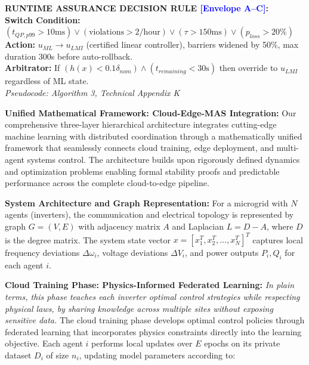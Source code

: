 \documentclass[12pt]{article}
\begin{document}
\begin{center}
\colorbox{red!20}{\begin{minipage}{0.95\textwidth}
\textbf{RUNTIME ASSURANCE DECISION RULE \textcolor{blue}{[Envelope A--C]}:} \\
\textbf{Switch Condition:} $(t_{QP,p99} > 10\text{ms}) \vee (\text{violations} > 2/\text{hour}) \vee (\tau > 150\text{ms}) \vee (p_{loss} > 20\%)$ \\
\textbf{Action:} $u_{ML} \rightarrow u_{LMI}$ (certified linear controller), barriers widened by 50\%, max duration 300s before auto-rollback. \\
\textbf{Arbitrator:} If $(h(x) < 0.1\delta_{nom}) \wedge (t_{remaining} < 30\text{s})$ then override to $u_{LMI}$ regardless of ML state. \\
\textit{Pseudocode: Algorithm 3, Technical Appendix K}
\end{minipage}}
\end{center}

\textbf{Unified Mathematical Framework: Cloud-Edge-MAS Integration:} Our comprehensive three-layer hierarchical architecture integrates cutting-edge machine learning with distributed coordination through a mathematically unified framework that seamlessly connects cloud training, edge deployment, and multi-agent systems control. The architecture builds upon rigorously defined dynamics and optimization problems enabling formal stability proofs and predictable performance across the complete cloud-to-edge pipeline.

\textbf{System Architecture and Graph Representation:} For a microgrid with $N$ agents (inverters), the communication and electrical topology is represented by graph $G = (V, E)$ with adjacency matrix $A$ and Laplacian $L = D - A$, where $D$ is the degree matrix. The system state vector $x = [x_1^T, x_2^T, \ldots, x_N^T]^T$ captures local frequency deviations $\Delta\omega_i$, voltage deviations $\Delta V_i$, and power outputs $P_i, Q_i$ for each agent $i$.

\textbf{Cloud Training Phase: Physics-Informed Federated Learning:} \textit{In plain terms, this phase teaches each inverter optimal control strategies while respecting physical laws, by sharing knowledge across multiple sites without exposing sensitive data.} The cloud training phase develops optimal control policies through federated learning that incorporates physics constraints directly into the learning objective. Each agent $i$ performs local updates over $E$ epochs on its private dataset $D_i$ of size $n_i$, updating model parameters according to:
\end{document}
